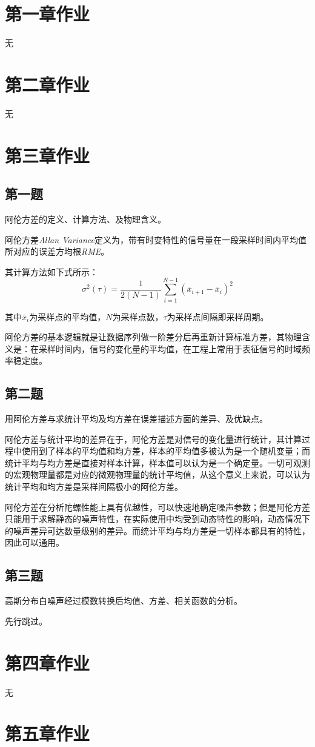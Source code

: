 \documentclass[11pt]{article}
\begin{document}
\newpage

\setcounter{tocdepth}{3}
\tableofcontents
\newpage

\setcounter{page}{1}
\section{第一章作业}
无
\section{第二章作业}
无
\section{第三章作业}
\subsection{第一题}
{\heiti 阿伦方差的定义、计算方法、及物理含义。}\par
阿伦方差\textit{Allan Variance}定义为，带有时变特性的信号量在一段采样时间内平均值所对应的误差方均根\textit{RME}。\par
其计算方法如下式所示：
\begin{equation}
  \sigma^2(\tau)=\frac{1}{2(N-1)}\sum_{i=1}^{N-1}(\bar{x}_{i+1}-\bar{x}_i)^2
\end{equation}\par
其中$\bar{x}_i$为采样点的平均值，$N$为采样点数，$\tau$为采样点间隔即采样周期。\par
阿伦方差的基本逻辑就是让数据序列做一阶差分后再重新计算标准方差\cite{HKJC202304012}，其物理含义是：在采样时间内，信号的变化量的平均值，在工程上常用于表征信号的时域频率稳定度。\par
\subsection{第二题}
{\heiti 用阿伦方差与求统计平均及均方差在误差描述方面的差异、及优缺点。}\par
阿伦方差与统计平均的差异在于，阿伦方差是对信号的变化量进行统计，其计算过程中使用到了样本的平均值和均方差，样本的平均值多被认为是一个随机变量；而统计平均与均方差是直接对样本计算，样本值可以认为是一个确定量。一切可观测的宏观物理量都是对应的微观物理量的统计平均值，从这个意义上来说，可以认为统计平均和均方差是采样间隔极小的阿伦方差。\par
阿伦方差在分析陀螺性能上具有优越性，可以快速地确定噪声参数；但是阿伦方差只能用于求解静态的噪声特性，在实际使用中均受到动态特性的影响，动态情况下的噪声差异可达数量级别的差异。而统计平均与均方差是一切样本都具有的特性，因此可以通用。
\subsection{第三题}
{\heiti 高斯分布白噪声经过模数转换后均值、方差、相关函数的分析。}\par
先行跳过。
\section{第四章作业}
无
\section{第五章作业}

\newpage
\printbibliography[heading=bibliography,title=参考文献]
\end{document}
